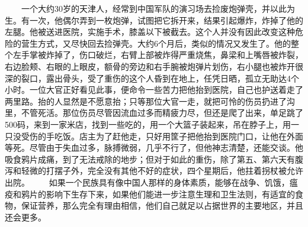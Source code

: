 \documentclass[12pt,oneside]{book}
\begin{document}
\begin{common-format}
　　一个大约30岁的天津人，经常到中国军队的演习场去捡废炮弹壳，并以此为生。有一次，他偶尔弄到一枚炮弹，试图把它拆开来，结果引起爆炸，炸掉了他的左腿。他被送进医院，实施手术，膝盖以下被截去。这个人并没有因此改变这种危险的营生方式，又尽快回去捡弹壳。大约6个月后，类似的情况又发生了。他的整个左手掌被炸掉了，伤口破烂，右臂上部被炸得严重烧焦，鼻梁和上嘴唇被炸裂，右边脸颊、右眼的上眼皮，额骨的旁边和右手腕被炮弹片划伤，右小腿也被炸开很深的裂口，露出骨头，受了重伤的这个人昏到在地上，任凭日晒，孤立无助达4个小时。一位大官正好看见此事，便命令一些苦力把他抬到医院，自己也护送着走了两里路。抬的人显然是不愿意抬；只等那位大官一走，就把可怜的伤员扔进了沟里，不管死活。那位伤员尽管因流血过多而精疲力尽，但还是爬了出来，单足跳了500码，来到一家米店，找到一些吃的，用一个大篮子装起来，吊在脖子上，用一只没受伤的手吃饭。店主为了赶他走，只好用筐子把他抬到医院门口，让他在外面等死。尽管由于失血过多，脉搏微弱，几乎不行了，但他神志清楚，还能交谈。他吸食鸦片成痛，到了无法戒除的地步；但对于如此的重伤，除了第五、第六天有腹泻和轻微的打摆子外，完全没有其他不好的症状，四个星期后，他拄着拐杖被允许出院。 
　　如果一个民族具有像中国人那样的身体素质，能够在战争、饥饿，瘟疫和鸦片的影响下生存下来，如果他们能进一步注意生理和卫生法则，有适宜的食物，保证营养，那么完全有理由相信，他们自己就足以占据世界的主要地区，并且还会更多。



\end{common-format}
\end{document}

